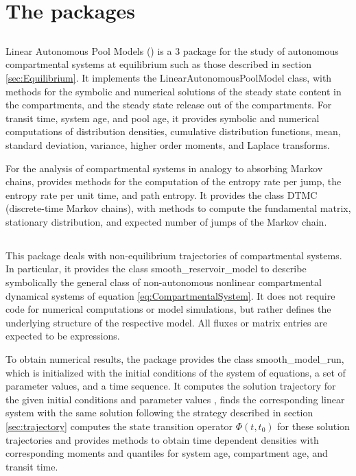 \section{The \python{} packages}
\label{sec:PythonPackages}
\subsection{\LAPM{}}
Linear Autonomous Pool Models (\LAPM{}) is a \python{} 3 package for the study of autonomous compartmental systems at equilibrium such as those described in section \ref{sec:Equilibrium}. 
It implements the LinearAutonomousPoolModel class, with methods for the
symbolic and numerical solutions of the steady state content in the compartments, and the steady state release out of the compartments. For transit time, system age, and pool age, it provides symbolic and numerical computations of distribution densities, cumulative distribution functions, mean, standard deviation,           variance, higher order moments, and Laplace transforms. 

For the analysis of compartmental systems in analogy to absorbing Markov chains, \LAPM{} provides methods for the computation of the entropy rate per jump, the entropy rate per unit time, and path entropy. It provides the class DTMC (discrete-time Markov chains), with methods to compute the fundamental matrix, stationary distribution, and expected number of jumps of the Markov chain.

\subsection{\CompartmentalSystems{}}
This package deals with non-equilibrium trajectories of compartmental systems.
In particular, it provides the class smooth\_reservoir\_model to describe
symbolically the general class of non-autonomous nonlinear compartmental
dynamical systems of equation \eqref{eq:CompartmentalSystem}. It does not
require code for numerical computations or model simulations, but rather defines the underlying structure of the respective model. 
All fluxes or matrix entries are expected to be \sympy{} 
expressions. 

To obtain numerical results, the package
provides the class smooth\_model\_run, which is initialized with the initial
conditions of the system of equations, a set of parameter values, and a time
sequence. It computes the solution trajectory for the given initial conditions and
parameter values , finds the corresponding linear system with the same solution
following the strategy described in section \ref{sec:trajectory} computes the
state transition operator $\Phi(t, t_0)$ for these solution trajectories and 
provides methods to obtain time dependent densities with corresponding moments and quantiles for system age, compartment age, and transit time. 

